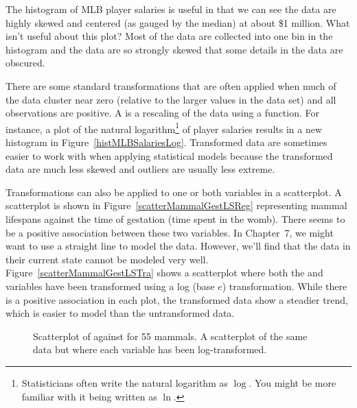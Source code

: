 \begin{example}{The histogram of MLB player salaries is useful in that we can see the data are highly skewed and centered (as gauged by the median) at about \$1 million. What isn't useful about this plot?}
Most of the data are collected into one bin in the histogram and the data are so strongly skewed that some details in the data are obscured.
\end{example}

There are some standard transformations that are often applied when much of the data cluster near zero (relative to the larger values in the data set) and all observations are positive. A  is a rescaling of the data using a function. For instance, a plot of the natural logarithm\footnote{Statisticians often write the natural logarithm as $\log$. You might be more familiar with it being written as $\ln$.} of player salaries results in a new histogram in Figure~\ref{histMLBSalariesLog}. Transformed data are sometimes easier to work with when applying statistical models because the transformed data are much less skewed and outliers are usually less extreme. %


Transformations can also be applied to one or both variables in a scatterplot. A scatterplot is shown in Figure~\ref{scatterMammalGestLSReg} representing mammal lifespans against the time of gestation (time spent in the womb). There seems to be a positive association between these two variables. In Chapter~7, %
we might want to use a straight line to model the data. However, we'll find that the data in their current state cannot be modeled very well. Figure~\ref{scatterMammalGestLSTra} shows a scatterplot where both the  and  variables have been transformed using a log (base $e$) transformation. While there is a positive association in each plot, the transformed data show a steadier trend, which is easier to model than the untransformed data.
\begin{figure}
\centering
{}
\caption{ Scatterplot of  against  for 55 mammals.  A scatterplot of the same data but where each variable has been log-transformed.}
\label{scatterMammalGestLS}
\end{figure}

